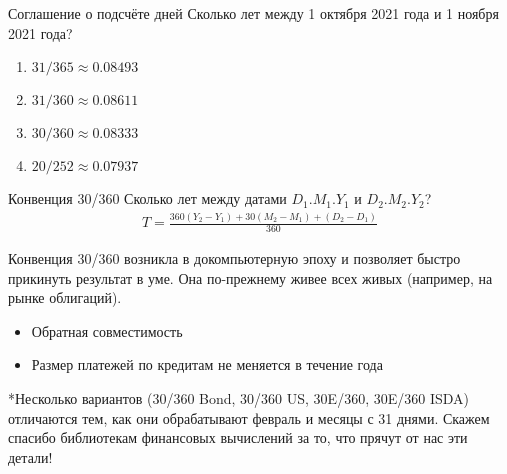 \documentclass{beamer}
\begin{document}
\begin{frame}{Соглашение о подсчёте дней}
\justify
Сколько лет между 1 октября 2021 года и 1 ноября 2021 года?
\begin{enumerate}[label=\Alph*]
\item $31/365 \approx 0.08493$ 
\item $31/360 \approx 0.08611$ 
\item $30/360 \approx 0.08333$ 
\item $20/252 \approx 0.07937$ 
\end{enumerate}

\vspace{\baselineskip}
\end{frame}



\begin{frame}{Конвенция 30/360}
\justify
Сколько лет между датами $D_1.M_1.Y_1$ и $D_2.M_2.Y_2$?
\begin{align*}
T = \frac{360(Y_2-Y_1) + 30(M_2-M_1) + (D_2-D_1)}{360}
\end{align*}

\justify
Конвенция 30/360 возникла в докомпьютерную эпоху и позволяет быстро прикинуть результат в уме. Она по-прежнему живее всех живых (например, на рынке облигаций).
\begin{itemize}
\item Обратная совместимость
\item Размер платежей по кредитам не меняется в течение года
\end{itemize}

\vspace{\baselineskip}
\justify
*Несколько вариантов (30/360 Bond, 30/360 US, 30E/360, 30E/360 ISDA) отличаются тем, как они обрабатывают февраль и месяцы с 31 днями. Скажем спасибо библиотекам финансовых вычислений за то, что прячут от нас эти детали!
\end{frame}
\end{document}
